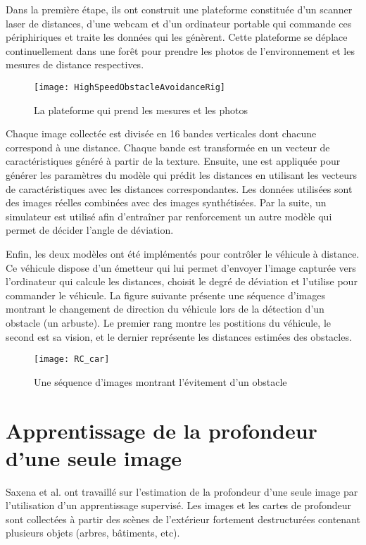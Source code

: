 Dans la première étape, ils ont construit une plateforme constituée d'un
scanner laser de distances, d'une webcam et d'un ordinateur portable qui commande
ces périphiriques et traite les données qui les génèrent. Cette plateforme se
déplace continuellement dans une forêt pour prendre les photos de
l'environnement et les mesures de distance respectives.

\begin{figure}[H]
\begin{center}
\texttt{[image: HighSpeedObstacleAvoidanceRig]}
\caption{La plateforme qui prend les mesures et les photos}{}
\end{center}
\end{figure}

Chaque image collectée est divisée en 16 bandes verticales dont chacune correspond
à une distance. Chaque bande est transformée en un vecteur de caractéristiques
généré à partir de la texture. Ensuite, une  est
appliquée pour générer les paramètres du modèle qui prédit les distances en
utilisant les vecteurs de caractéristiques avec les distances correspondantes.
Les données utilisées sont des images réelles combinées avec des images synthétisées.
Par la suite, un simulateur est utilisé afin d'entraîner par renforcement un
autre modèle qui permet de décider l'angle de déviation.

Enfin, les deux modèles ont été implémentés pour contrôler le véhicule à
distance. Ce véhicule dispose d'un émetteur qui lui permet d'envoyer l'image
capturée vers l'ordinateur qui calcule les distances, choisit le degré de
déviation et l'utilise pour commander le véhicule. La figure suivante présente
une séquence d'images montrant le changement de direction du véhicule lors de
la détection d'un obstacle (un arbuste). Le premier rang montre les postitions
du véhicule, le second est sa vision, et le dernier représente les distances
estimées des obstacles.

\begin{figure}[H]
\texttt{[image: RC\_car]}
\caption{Une séquence d'images montrant l'évitement d'un obstacle}{}
\end{figure}

\section{Apprentissage de la profondeur d'une seule image}

Saxena et al.\cite{saxena2005learning} ont travaillé sur l'estimation de la
profondeur d'une seule image par l'utilisation d'un apprentissage supervisé.
Les images et les cartes de profondeur sont collectées à partir des scènes de
l'extérieur fortement destructurées contenant plusieurs objets (arbres, bâtiments, etc).

